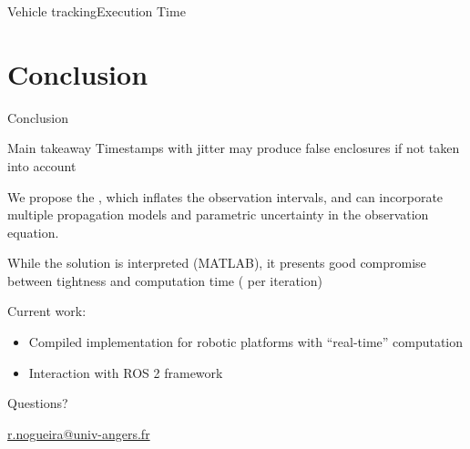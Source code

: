 \documentclass[aspectratio=169]{conf-beamer}
\begin{document}
\begin{frame}{Vehicle tracking}{Execution Time}
  \begin{table}[bt]
  \caption{Mean execution times ($\unit{\ms}$) for different observation time errors.}\label{tab:comparison_time}
  \centering
\end{table}
\end{frame}


\section{Conclusion}

\begin{frame}{Conclusion}

  \vfill
  \begin{block}{Main takeaway}
    Timestamps with jitter may produce false enclosures if not taken into account
  \end{block}
  \pause

  We propose the \structure{\czesmflong}, which inflates the observation intervals, and can incorporate multiple propagation models and parametric uncertainty in the observation equation.
  \pause

  \vfill
  While the solution is interpreted (MATLAB), it presents good compromise between tightness and computation time ( per iteration)

  \pause
  \vfill
  Current work:
\begin{itemize}
  \item Compiled implementation for robotic platforms with ``real-time'' computation
  \item Interaction with ROS 2 framework
\end{itemize}

\end{frame}

\begin{frame}[plain]
  \endpage%
  \centering
  \begin{minipage}[t]{.5\linewidth}
    \small
    \centering
    {
      Questions?

      \vspace{.5cm}
      \href{mailto:r.nogueira@univ-angers.fr?subject=Presentation IFAC WC 2026}{r.nogueira@univ-angers.fr}

      \vspace{.5cm}
    }
  \end{minipage}
\end{frame}
\end{document}
